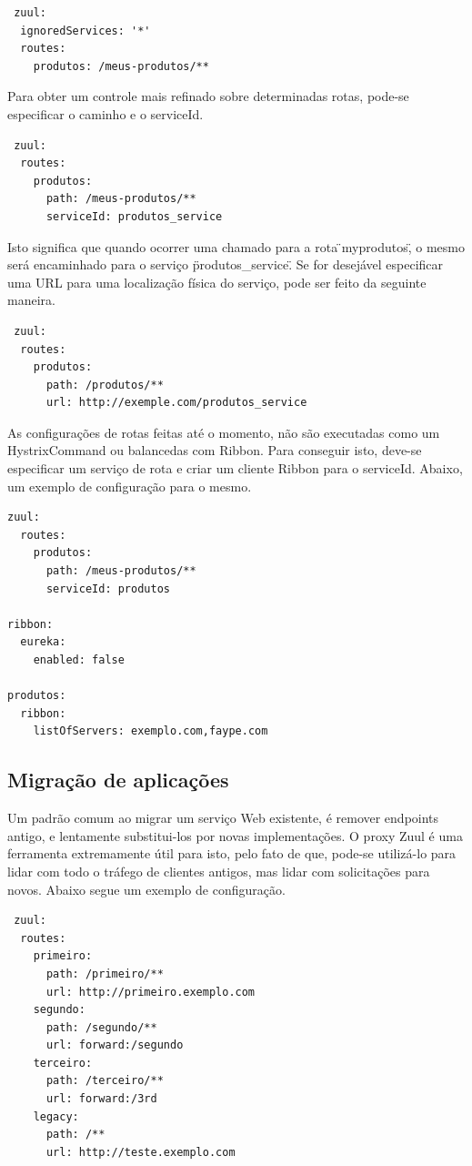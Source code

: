\begin{verbatim}
 zuul:
  ignoredServices: '*'
  routes:
    produtos: /meus-produtos/**
\end{verbatim}

Para obter um controle mais refinado sobre determinadas rotas, pode-se especificar o caminho e o serviceId.

\begin{verbatim}
 zuul:
  routes:
    produtos:
      path: /meus-produtos/**
      serviceId: produtos_service
\end{verbatim}

Isto significa que quando ocorrer uma chamado para a rota \"\/myprodutos\", o mesmo será encaminhado para o serviço \"produtos\_service\". Se for desejável especificar uma URL para uma localização física do serviço, pode ser feito da seguinte maneira.

\begin{verbatim}
 zuul:
  routes:
    produtos:
      path: /produtos/**
      url: http://exemple.com/produtos_service
\end{verbatim}

As configurações de rotas feitas até o momento, não são executadas como um HystrixCommand ou balancedas com Ribbon. Para conseguir isto, deve-se especificar um serviço de rota e criar um cliente Ribbon para o serviceId. Abaixo, um exemplo de configuração para o mesmo.

\begin{verbatim}
zuul:
  routes:
    produtos:
      path: /meus-produtos/**
      serviceId: produtos

ribbon:
  eureka:
    enabled: false

produtos:
  ribbon:
    listOfServers: exemplo.com,faype.com
\end{verbatim}

\subsection{Migração de aplicações}

Um padrão comum ao migrar um serviço Web existente, é remover endpoints antigo, e lentamente substitui-los por novas implementações. O proxy Zuul é uma ferramenta extremamente útil para isto, pelo fato de que, pode-se utilizá-lo para lidar com todo o tráfego de clientes antigos, mas lidar com solicitações para novos. Abaixo segue um exemplo de configuração.

\begin{verbatim}
 zuul:
  routes:
    primeiro:
      path: /primeiro/**
      url: http://primeiro.exemplo.com
    segundo:
      path: /segundo/**
      url: forward:/segundo
    terceiro:
      path: /terceiro/**
      url: forward:/3rd
    legacy:
      path: /**
      url: http://teste.exemplo.com
\end{verbatim}

